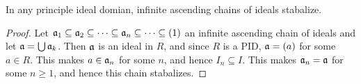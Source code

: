 \begin{lemma}\label{lemma_6.2.4}
  In any principle ideal domian, infinite ascending chains of ideals
  stabalize.
\end{lemma}
\begin{proof}
  Let $\mathfrak{a}_1 \subseteq \mathfrak{a}_2 \subseteq \dots \subseteq \mathfrak{a}_n \subseteq
  \dots \subseteq (1)$ an infinite ascending chain of ideals and let
  $\mathfrak{a}=\bigcup{\mathfrak{a}_k}$. Then $\mathfrak{a}$ is an ideal in  $R$, and since
  $R$ is a PID,  $\mathfrak{a}=(a)$ for some $a \in R$. This makes  $a \in \mathfrak{a}_n$
  for some  $n$, and hence  $I_n \subseteq I$. This makes $\mathfrak{a}_n=\mathfrak{a}$ for some
  $n \geq 1$, and hence this chain stabalizes.
\end{proof}

